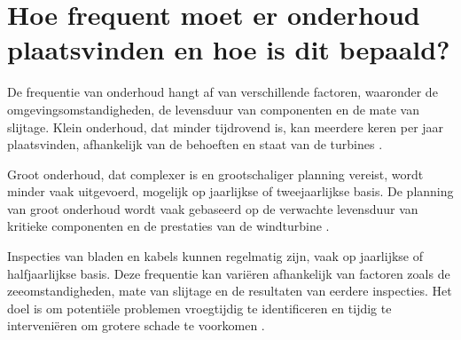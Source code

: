 \section{Hoe frequent moet er onderhoud plaatsvinden en hoe is dit bepaald?}

De frequentie van onderhoud hangt af van verschillende factoren, waaronder de omgevingsomstandigheden, de levensduur van componenten en de mate van slijtage. Klein onderhoud, dat minder tijdrovend is, kan meerdere keren per jaar plaatsvinden, afhankelijk van de behoeften en staat van de turbines \cite{Eneco_presentatie}.

Groot onderhoud, dat complexer is en grootschaliger planning vereist, wordt minder vaak uitgevoerd, mogelijk op jaarlijkse of tweejaarlijkse basis. De planning van groot onderhoud wordt vaak gebaseerd op de verwachte levensduur van kritieke componenten en de prestaties van de windturbine \cite{Eneco_presentatie}.

Inspecties van bladen en kabels kunnen regelmatig zijn, vaak op jaarlijkse of halfjaarlijkse basis. Deze frequentie kan variëren afhankelijk van factoren zoals de zeeomstandigheden, mate van slijtage en de resultaten van eerdere inspecties. Het doel is om potentiële problemen vroegtijdig te identificeren en tijdig te interveniëren om grotere schade te voorkomen \cite{Eneco_presentatie}.
